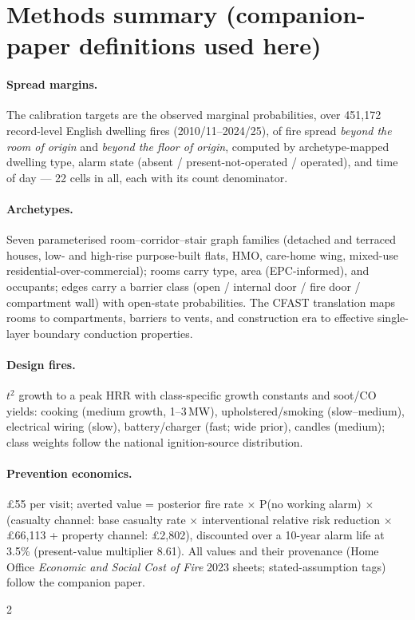 \documentclass[11pt]{article}
\begin{document}
\appendix
\section{Methods summary (companion-paper definitions used here)}
\label{app:methods}

\paragraph{Spread margins.} The calibration targets are the observed marginal
probabilities, over 451{,}172 record-level English dwelling fires
(2010/11--2024/25), of fire spread \emph{beyond the room of origin} and
\emph{beyond the floor of origin}, computed by archetype-mapped dwelling type,
alarm state (absent / present-not-operated / operated), and time of day ---
22 cells in all, each with its count denominator.

\paragraph{Archetypes.} Seven parameterised room--corridor--stair graph
families (detached and terraced houses, low- and high-rise purpose-built
flats, HMO, care-home wing, mixed-use residential-over-commercial); rooms carry
type, area (EPC-informed), and occupants; edges carry a barrier class (open /
internal door / fire door / compartment wall) with open-state probabilities.
The CFAST translation maps rooms to compartments, barriers to vents, and
construction era to effective single-layer boundary conduction properties.

\paragraph{Design fires.} $t^2$ growth to a peak HRR with class-specific
growth constants and soot/CO yields: cooking (medium growth, 1--3\,MW),
upholstered/smoking (slow--medium), electrical wiring (slow),
battery/charger (fast; wide prior), candles (medium); class weights follow the
national ignition-source distribution.

\paragraph{Prevention economics.} \pounds55 per visit; averted value =
posterior fire rate $\times$ P(no working alarm) $\times$ (casualty channel:
base casualty rate $\times$ interventional relative risk reduction $\times$
\pounds66{,}113 + property channel: \pounds2{,}802), discounted over a
10-year alarm life at 3.5\% (present-value multiplier 8.61). All values and
their provenance (Home Office \emph{Economic and Social Cost of Fire} 2023
sheets; stated-assumption tags) follow the companion paper.


{\small
\setlength{\columnsep}{18pt}
\begin{multicols}{2}


\end{multicols}
}
\end{document}
